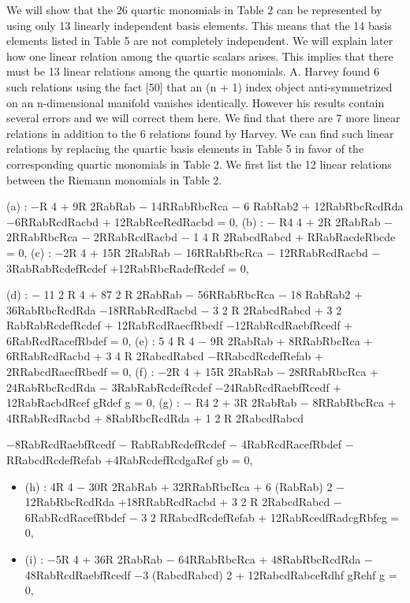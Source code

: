 \documentclass{article}
\begin{document}
We will show that the 26 quartic monomials in Table 2 can be represented by using only 13 linearly independent basis elements. This means that the 14 basis elements listed in Table 5 are not completely independent. We will explain later how one linear relation among the quartic scalars arises. This implies that there must be 13 linear relations among the quartic monomials. A. Harvey found 6 such relations using the fact [50] that an (n + 1) index object anti-symmetrized on an n-dimensional manifold vanishes identically. However his results contain several errors and we will correct them here. We find that there are 7 more linear relations in addition to the 6 relations found by Harvey. We can find such linear relations by replacing the quartic basis elements in Table 5 in favor of the corresponding quartic monomials in Table 2. We first list the 12 linear relations between the Riemann monomials in Table 2.

(a) : −R 4 + 9R 2RabRab − 14RRabRbcRca − 6 RabRab2 + 12RabRbcRcdRda −6RRabRcdRacbd + 12RabRceRedRacbd = 0, (b) : − R4 4 + 2R 2RabRab − 2RRabRbcRca − 2RRabRcdRacbd − 1 4 R 2RabcdRabcd + RRabRacdeRbcde = 0, (c) : −2R 4 + 15R 2RabRab − 16RRabRbcRca − 12RRabRcdRacbd − 3RabRabRcdefRcdef +12RabRbcRadefRcdef = 0,

(d) : − 11 2 R 4 + 87 2 R 2RabRab − 56RRabRbcRca − 18 RabRab2 + 36RabRbcRcdRda −18RRabRcdRacbd − 3 2 R 2RabcdRabcd + 3 2 RabRabRcdefRcdef + 12RabRcdRaecfRbedf −12RabRcdRaebfRcedf + 6RabRcdRacefRbdef = 0, (e) : 5 4 R 4 − 9R 2RabRab + 8RRabRbcRca + 6RRabRcdRacbd + 3 4 R 2RabcdRabcd −RRabcdRcdefRefab + 2RRabcdRaecfRbedf = 0, (f) : −2R 4 + 15R 2RabRab − 28RRabRbcRca + 24RabRbcRcdRda − 3RabRabRcdefRcdef −24RabRcdRaebfRcedf + 12RabRacbdRcef gRdef g = 0, (g) : − R4 2 + 3R 2RabRab − 8RRabRbcRca + 4RRabRcdRacbd + 8RabRbcRcdRda + 1 2 R 2RabcdRabcd

−8RabRcdRaebfRcedf − RabRabRcdefRcdef − 4RabRcdRacefRbdef − RRabcdRcdefRefab +4RabRcdefRcdgaRef gb = 0,
\begin{itemize}
\item 
(h) : 4R 4 − 30R 2RabRab + 32RRabRbcRca + 6 (RabRab) 2 − 12RabRbcRcdRda +18RRabRcdRacbd + 3 2 R 2RabcdRabcd − 6RabRcdRacefRbdef − 3 2 RRabcdRcdefRefab + 12RabRcedfRadcgRbfeg = 0,

\item 
(i) : −5R 4 + 36R 2RabRab − 64RRabRbcRca + 48RabRbcRcdRda − 48RabRcdRaebfRcedf −3 (RabcdRabcd) 2 + 12RabcdRabceRdhf gRehf g = 0,

\end{itemize}
\end{document}
